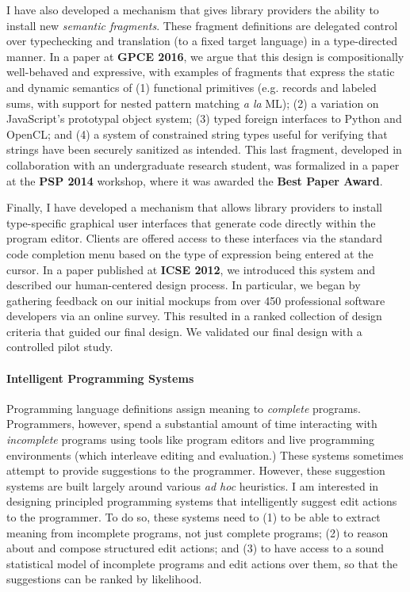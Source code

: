 \documentclass[9pt]{extarticle}
\let\li\lstinline
\begin{document}
I have also developed a mechanism that gives library providers the ability to install new \emph{semantic fragments}. These fragment definitions are delegated control over typechecking and translation (to a fixed target language) in a type-directed manner. In a paper at \textbf{GPCE 2016}, we argue that this design is compositionally well-behaved and expressive, with examples of
fragments that express the static and dynamic semantics of
(1) functional primitives (e.g. records and labeled sums, with support for nested pattern
matching \emph{a la} ML); (2) a variation on JavaScript's prototypal
object system; (3) typed foreign interfaces to Python and
OpenCL; and (4) a system of constrained string types useful for verifying that strings have been securely sanitized as intended. This last fragment, developed in collaboration with an undergraduate research student, was formalized in a paper at the \textbf{PSP 2014} workshop, where it was awarded the \textbf{Best Paper Award}. %

Finally, I have developed a mechanism that allows library providers to install type-specific {graphical user interfaces} that generate code directly within the program editor. Clients are offered access to these interfaces via the standard code completion menu based on the type of expression being entered at the cursor. In a paper published at \textbf{ICSE 2012}, we introduced this system and described our human-centered design process. In particular, we began by gathering feedback on our initial mockups from over 450 professional software developers via an online survey. This resulted in a ranked collection of design criteria that guided our final design. We validated our final design with a controlled pilot study.

\vspace{-8px}
\paragraph{Intelligent Programming Systems}
Programming language definitions assign meaning to \emph{complete} programs. 
Programmers, however, spend a substantial amount of time interacting with \emph{incomplete} programs using tools like program editors and live programming environments (which interleave editing and evaluation.) These systems sometimes attempt to provide suggestions to the programmer. However, these suggestion systems are built largely around various \emph{ad hoc} heuristics. I am interested in designing principled programming systems that intelligently suggest edit actions to the programmer. To do so, these systems need to (1) to be able to extract meaning from incomplete programs, not just complete programs; (2) to reason about and compose structured edit actions; and (3) to have access to a sound statistical model of incomplete programs and edit actions over them, so that the suggestions can be ranked by likelihood.
\end{document}
